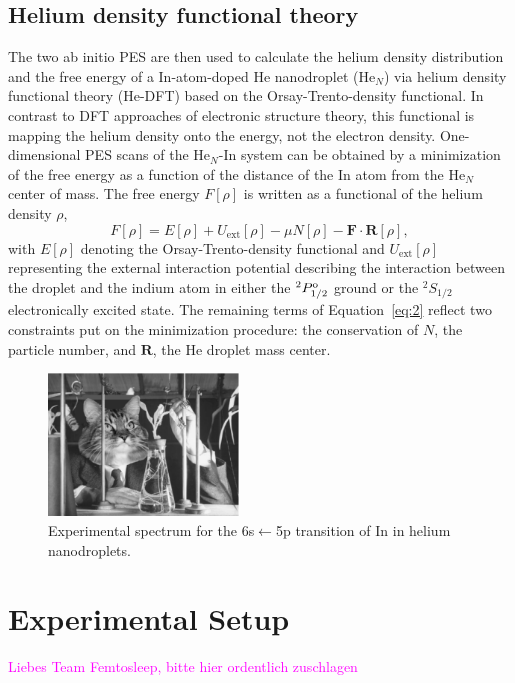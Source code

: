 \documentclass[twoside,twocolumn,9pt]{article}
\def\hl#1{\textcolor{magenta}{#1}}  %
\begin{document}
\subsection{Helium density functional theory}
The two ab initio PES are then used to calculate the helium density distribution and the free energy of a In-atom-doped He nanodroplet (He$_N$) via helium density functional theory (He-DFT) based on the Orsay-Trento-density functional.\cite{Dalfovo:1995gf} In contrast to DFT approaches of electronic structure theory, this functional is mapping the helium density onto the energy, not the electron density. One-dimensional PES scans of the He$_{N}$-In system can be obtained by a minimization of the free energy as a function of the distance of the In atom from the He$_{N}$ center of mass. The free energy $F[\rho]$ is written as a functional of the helium density $\rho$,
\begin{equation}
  \label{eq:he}
  F[\rho{}] = E[\rho] + U_{\mathrm{ext}}[\rho] - \mu{}N[\rho] - \mathbf{F}\cdot{}\mathbf{R}
[\rho], 
\end{equation}
with $E[\rho]$ denoting the Orsay-Trento-density functional and $U_{\mathrm{ext}}[\rho]$  representing the external interaction potential describing the interaction between the droplet and the indium atom in either the $^2P^{\rm o}_{1/2}$ ground or the $^2S_{1/2}$ electronically excited state. The remaining terms of Equation~\ref{eq:2} reflect two constraints put on the minimization procedure: the conservation of $N$, the particle number, and $\mathbf{R}$, the He droplet mass center.


\begin{figure}[htbp!]
  	\begin{center}
 		\includegraphics[width=0.45\textwidth]{2.eps}
                \caption{Experimental spectrum for the 6s$\leftarrow{}$5p  transition of In in helium nanodroplets.\label{pic:exp}}
  	\end{center}
\end{figure}


\section{Experimental Setup}
\hl{Liebes Team Femtosleep, bitte hier ordentlich zuschlagen}
\end{document}
